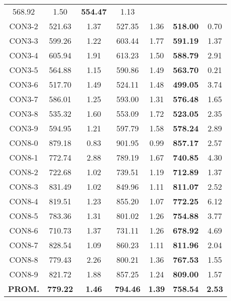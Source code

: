 \begin{table}[ht]
\begin{tabular}{c c c c c c c}
568.92 & 1.50 & \bf{554.47} & 
1.13\\CON3-2 & 521.63 & 1.37 & 
527.35 & 1.36 & \bf{518.00} & 
0.70\\CON3-3 & 599.26 & 1.22 & 
603.44 & 1.77 & \bf{591.19} & 
1.37\\CON3-4 & 605.94 & 1.91 & 
613.23 & 1.50 & \bf{588.79} & 
2.91\\CON3-5 & 564.88 & 1.15 & 
590.86 & 1.49 & \bf{563.70} & 
0.21\\CON3-6 & 517.70 & 1.49 & 
524.11 & 1.48 & \bf{499.05} & 
3.74\\CON3-7 & 586.01 & 1.25 & 
593.00 & 1.31 & \bf{576.48} & 
1.65\\CON3-8 & 535.32 & 1.60 & 
553.09 & 1.72 & \bf{523.05} & 
2.35\\CON3-9 & 594.95 & 1.21 & 
597.79 & 1.58 & \bf{578.24} & 
2.89\\CON8-0 & 879.18 & 0.83 & 
901.95 & 0.99 & \bf{857.17} & 
2.57\\CON8-1 & 772.74 & 2.88 & 
789.19 & 1.67 & \bf{740.85} & 
4.30\\CON8-2 & 722.68 & 1.02 & 
739.51 & 1.19 & \bf{712.89} & 
1.37\\CON8-3 & 831.49 & 1.02 & 
849.96 & 1.11 & \bf{811.07} & 
2.52\\CON8-4 & 819.51 & 1.23 & 
855.20 & 1.07 & \bf{772.25} & 
6.12\\CON8-5 & 783.36 & 1.31 & 
801.02 & 1.26 & \bf{754.88} & 
3.77\\CON8-6 & 710.73 & 1.37 & 
731.11 & 1.26 & \bf{678.92} & 
4.69\\CON8-7 & 828.54 & 1.09 & 
860.23 & 1.11 & \bf{811.96} & 
2.04\\CON8-8 & 779.43 & 2.26 & 
800.21 & 1.36 & \bf{767.53} & 
1.55\\CON8-9 & 821.72 & 1.88 & 
857.25 & 1.24 & \bf{809.00} & 
1.57\\\bf{PROM.} & 
\bf{779.22} & \bf{1.46} & \bf{794.46} & \bf{1.39} & \bf{758.54} & \bf{2.53}\\[1ex]\hline
\end{tabular}
\label{table:nonlin}
\end{table} \clearpage
